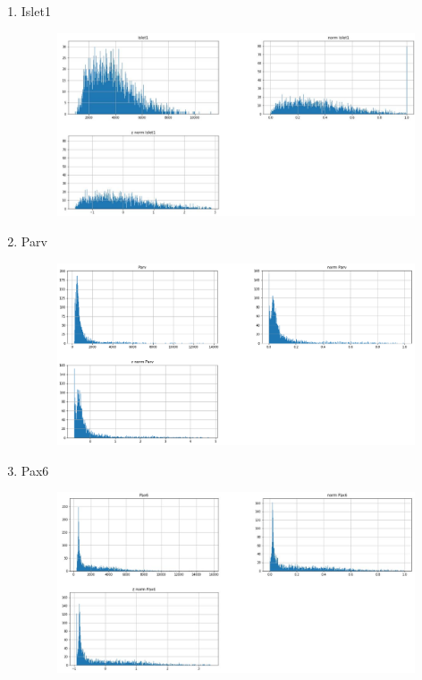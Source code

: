 \documentclass[11pt]{article}
\begin{document}
\begin{enumerate}
\begin{figure}[h!]
\end{figure}
\item Islet1
\begin{figure}[h!]
  \includegraphics[width=\linewidth]{hist/Islet1.JPG}
\end{figure}
\newpage
\item Parv
\begin{figure}[h!]
  \includegraphics[width=\linewidth]{hist/Parv.png}
\end{figure}
\item Pax6
\begin{figure}[h!]
  \includegraphics[width=\linewidth]{hist/Pax6.JPG}

\end{figure}
\end{enumerate}
\end{document}
